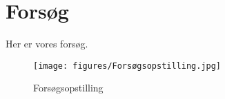 \chapter{Forsøg}
Her er vores forsøg.
\begin{figure}[htbp]
    \centering
    \texttt{[image: figures/Forsøgsopstilling.jpg]}
    \caption{Forsøgsopstilling}
\end{figure}